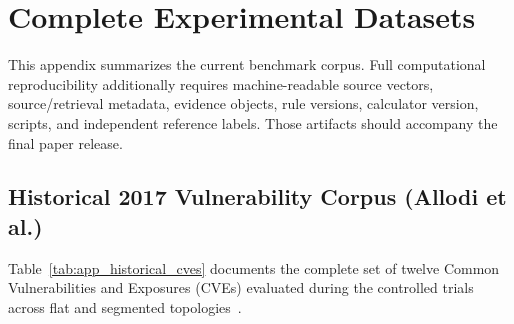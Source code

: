 \chapter{Complete Experimental Datasets}
\label{app:historical_dataset}

This appendix summarizes the current benchmark corpus. Full computational reproducibility additionally requires machine-readable source vectors, source/retrieval metadata, evidence objects, rule versions, calculator version, scripts, and independent reference labels. Those artifacts should accompany the final paper release.

\section{Historical 2017 Vulnerability Corpus (Allodi et al.)}
\label{sec:app_historical_cves}
Table~\ref{tab:app_historical_cves} documents the complete set of twelve Common Vulnerabilities and Exposures (CVEs) evaluated during the controlled trials across flat and segmented topologies~\cite{santos2017estimating}.

